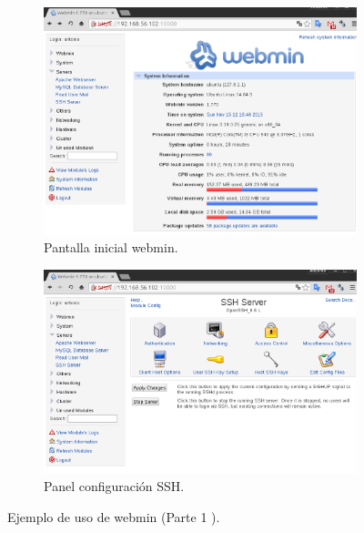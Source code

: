 \begin{figure}[H]
    \centering
    \begin{subfigure}[b]{0.7\textwidth}
        \includegraphics[width=\textwidth]{imagenes/img25.eps}
    \caption{Pantalla inicial webmin.} 
    \label{fig22} 
    \end{subfigure}
    
        \begin{subfigure}[b]{0.7\textwidth}
        \includegraphics[width=\textwidth]{imagenes/img26.eps}
    \caption{Panel configuración SSH.} 
    \label{fig23} 
    \end{subfigure}
        \caption{Ejemplo de uso de webmin  (Parte 1 ).}  
\end{figure}


